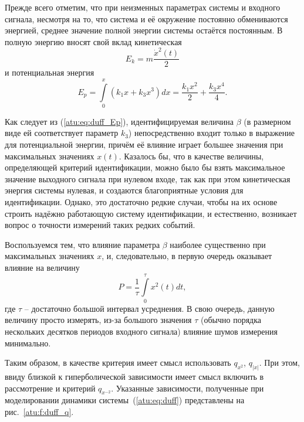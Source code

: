 Прежде всего отметим, что при неизменных параметрах
системы и входного сигнала, несмотря на то, что
система и её окружение постоянно обмениваются энергией,
среднее значение полной энергии системы остаётся постоянным.
В полную энергию вносят свой вклад кинетическая
%
\begin{equation}
E_k = m \frac{\dot{x}^2(t)}{2}
\label{atu:eq:duff_Ek}
\end{equation}
%
и потенциальная энергия
%
\begin{equation}
E_p = \int\limits_0^x ( k_1 x + k_3 x^3 ) dx =
\frac{k_1 x^2}{2} + \frac{k_3 x^4}{4}.
\label{atu:eq:duff_Ep}
\end{equation}

Как следует из (\ref{atu:eq:duff_Ep}), идентифицируемая
величина \( \beta \)
(в размерном виде ей соответствует параметр \(k_3\))
непосредственно входит только в выражение для
потенциальной энергии, причём её влияние играет большее
значения при максимальных значениях \(x(t)\).
Казалось бы, что в качестве величины, определяющей
критерий идентификации, можно было бы взять
максимальное значение выходного сигнала
при нулевом входе, так как при этом кинетическая энергия системы нулевая,
и создаются благоприятные условия для идентификации.
Однако, это достаточно редкие случаи, чтобы на их основе
строить надёжно работающую систему идентификации, и
естественно, возникает вопрос о точности измерений таких редких
событий.

Воспользуемся тем, что влияние параметра \(\beta\)
наиболее существенно при максимальных значениях \(x\),
и, следовательно, в первую очередь оказывает влияние на величину
%
\begin{equation}
 P = \frac{1}{\tau}\int\limits_0^\tau x^2(t) dt ,
\label{atu:eq:duff_P}
\end{equation}
%
где \(\tau\) -- достаточно большой интервал усреднения.
В свою очередь, данную величину просто измерять,
из-за большого значения \(\tau\) (обычно порядка нескольких десятков
периодов входного сигнала) влияние шумов измерения минимально.

Таким образом, в качестве критерия имеет смысл использовать
$q_{x^2}$, $q_{|x|}$. При этом, ввиду близкой к гиперболической зависимости
имеет смысл включить в рассмотрение и критерий $q_{x^{-2}}$.
Указанные зависимости, полученные при моделировании динамики системы~(\ref{atu:eq:duff})
представлены на рис.~\ref{atu:f:duff_q}.

